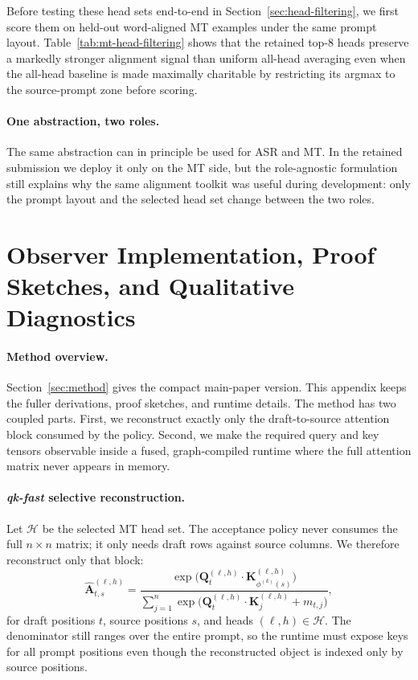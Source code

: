 \documentclass[11pt]{article}
\begin{document}
\noindent Before testing these head sets end-to-end in
Section~\ref{sec:head-filtering}, we first score them on held-out word-aligned
MT examples under the same prompt layout. Table~\ref{tab:mt-head-filtering}
shows that the retained top-8 heads preserve a markedly stronger alignment
signal than uniform all-head averaging even when the all-head baseline is made
maximally charitable by restricting its argmax to the source-prompt zone
before scoring.





\paragraph{One abstraction, two roles.}
The same abstraction can in principle be used for ASR and MT. In the retained
submission we deploy it only on the MT side, but the role-agnostic formulation
still explains why the same alignment toolkit was useful during development:
only the prompt layout and the selected head set change between the two roles.

\section{Observer Implementation, Proof Sketches, and Qualitative Diagnostics}
\label{sec:appendix-observer}
\label{sec:qk-fast}
\label{sec:vllm}

\paragraph{Method overview.}
Section~\ref{sec:method} gives the compact main-paper version. This appendix
keeps the fuller derivations, proof sketches, and runtime details. The method
has two coupled parts. First, we reconstruct exactly only the draft-to-source
attention block consumed by the policy. Second, we make the required query and
key tensors observable inside a fused, graph-compiled runtime where the full
attention matrix never appears in memory.

\paragraph{\emph{qk-fast} selective reconstruction.}
Let $\mathcal{H}$ be the selected MT head set. The acceptance policy never
consumes the full $n \times n$ matrix; it only needs draft rows against source
columns. We therefore reconstruct only that block:
\begin{equation}
  \widehat{\mathbf{A}}^{(\ell,h)}_{t,s}
  =
  \frac{\exp\!\bigl(\mathbf{Q}^{(\ell,h)}_t \cdot
    \mathbf{K}^{(\ell,h)}_{\phi^{(k)}(s)}\bigr)}
       {\sum_{j=1}^{n} \exp\!\bigl(
         \mathbf{Q}^{(\ell,h)}_t \cdot \mathbf{K}^{(\ell,h)}_j + m_{t,j}
       \bigr)},
  \label{eq:qk-fast}
\end{equation}
for draft positions $t$, source positions $s$, and heads $(\ell,h)\in
\mathcal{H}$. The denominator still ranges over the entire prompt, so the
runtime must expose keys for all prompt positions even though the reconstructed
object is indexed only by source positions.
\end{document}
